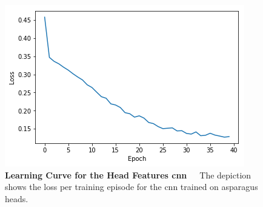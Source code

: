 \begin{table}[!hb]
	\centering
	\caption[Head Features CNN Performance]{\textbf{Performance}~~~Performance of the \acrshort{cnn} trained on asparagus heads.}
	\label{tab:performance_measures_head_based}
\end{table}

\begin{figure}[!htb]
	\centering
	\includegraphics[scale=1.8]{Figures/chapter04/head_curve.png}
	\decoRule
	\caption[Head Features CNN Learning Curve]{\textbf{Learning Curve for the Head Features \acrshort{cnn}}~~~The depiction shows the loss per training episode for the \acrshort{cnn} trained on asparagus heads.}
	\label{fig:HeadCurve}
\end{figure}	

